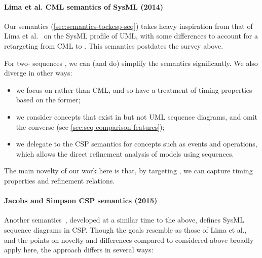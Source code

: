 \paragraph{Lima et al. CML semantics of SysML (2014)}

Our \tockcsp{} semantics (\cref{sec:semantics-tockcsp-seq}) takes heavy inspiration
from that of Lima et al.~\cite{lima-semantics} on the SysML profile of UML, with
some differences to account for a retargeting from CML to \tockcsp.  This
semantics postdates the survey above.

For two-\mactor{} sequences , we can (and do)
simplify the semantics significantly.  We also diverge in other ways:

\begin{itemize}
\item we focus on \tockcsp{} rather than CML, and so have a
  treatment of timing properties based on the former;
\item
  we consider concepts that exist in \langname{} but not UML sequence
  diagrams, and omit the converse
  (see \cref{sec:seq-comparison-features});
\item
  we delegate to the \robostar{} CSP semantics for concepts such as events and
  operations, which allows the direct refinement analysis of \robostar{} models
  using sequences.
\end{itemize}

The main novelty of our work here is that, by targeting \tockcsp, we can capture
timing properties and refinement relations.

\paragraph{Jacobs and Simpson CSP semantics (2015)}

Another semantics~\cite{Jacobs15-SeqCSP}, developed at a similar time to
the above, defines SysML sequence diagrams in CSP.
Though the goals resemble as those of Lima et al.,
and the points on novelty and differences compared to \langname{} considered
above broadly apply here, the approach differs in several ways:

